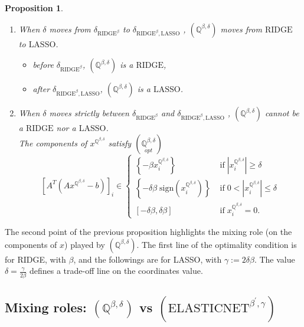 \documentclass[fleqn]{report} %
\newcommand\ddfrac[2]{\frac{\displaystyle #1}{\displaystyle #2}}
\newtheorem{thm}{Proposition}[subsection]
\begin{document}
\begin{thm} 
\begin{enumerate}
\item When $\delta$ moves from $ \delta_{\text{RIDGE}^{\beta}}$ to $\delta_{\text{RIDGE}^{\beta},\text{LASSO}}$ , $(\mathbb{Q}^{\beta,\delta})$ moves from $\text{RIDGE}$ to $\text{LASSO}$.
\begin{itemize}
\item before $ \delta_{\text{RIDGE}^{\beta}}$, $(\mathbb{Q}^{\beta,\delta})$ is a $\text{RIDGE}$,
\item after $ \delta_{\text{RIDGE}^{\beta},\text{LASSO}}$, $(\mathbb{Q}^{\beta,\delta})$ is a $\text{LASSO}$.
\end{itemize}
\item When $\delta$ moves strictly between $ \delta_{\text{RIDGE}^{\beta}}$ and $\delta_{\text{RIDGE}^{\beta},\text{LASSO}}$ , $(\mathbb{Q}^{\beta,\delta})$ cannot be a $\text{RIDGE}$ nor a $\text{LASSO}$.\\
The components of $x^{\mathbb{Q}^{\beta,\delta} }$ satisfy $\left(\underset{opt}{\mathbb{Q}^{\beta,\delta}}\right)$
\[
\left[A^T(Ax^{\mathbb{Q}^{\beta,\delta}}-b)\right]_i\in 
\left\{ \begin{array}{ll}
\left\{-\beta x^{\mathbb{Q}^{\beta,\delta}}_i\right\}&\;\text{if}\; \left|x^{\mathbb{Q}^{\beta,\delta}}_i\right|\geq \delta\\
\left\{-\delta\beta\;\text{sign}(x^{\mathbb{Q}^{\beta,\delta}}_i)\right\} &\;\text{if}\; 0<\left|x^{\mathbb{Q}^{\beta,\delta}}_i\right|\leq \delta\\
\left[-\delta\beta, \delta\beta\right]&\;\text{if}\; x^{\mathbb{Q}^{\beta,\delta}}_i=0.
\end{array}
\right.
\]
\end{enumerate}
\end{thm}
The second point of the previous proposition highlights the mixing role (on the components of $x$) played by $(\mathbb{Q}^{\beta,\delta} )$. The first line of the optimality condition is for RIDGE, with $\beta$, and the followings are for LASSO,  with $\gamma:=2\delta\beta$. The value $\delta=\ddfrac{\gamma}{2\beta}$ defines a trade-off line on the coordinates value.
\subsection{Mixing roles: $(\mathbb{Q}^{\beta,\delta} )$  vs $(\text{ELASTICNET}^{\beta^{\prime},\gamma})$}
\end{document}
